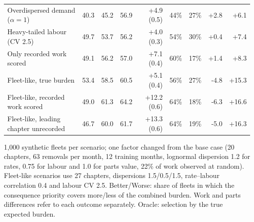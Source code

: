 \begin{table}[htbp]
{\begin{tabular}{lrrrrrrrr}
Overdispersed demand ($\alpha=1$) & 40.3 & 45.2 & 56.9 & +4.9 (0.5) & 44\% & 27\% & +2.8 & +6.1 \\
Heavy-tailed labour (CV 2.5) & 49.7 & 53.7 & 56.2 & +4.0 (0.3) & 54\% & 30\% & +0.4 & +7.4 \\
Only recorded work scored & 49.1 & 56.2 & 57.0 & +7.1 (0.4) & 60\% & 17\% & +1.4 & +8.3 \\
Fleet-like, true burden & 53.4 & 58.5 & 60.5 & +5.1 (0.4) & 56\% & 27\% & -4.8 & +15.3 \\
Fleet-like, recorded work scored & 49.0 & 61.3 & 64.2 & +12.2 (0.6) & 64\% & 18\% & -6.3 & +16.6 \\
Fleet-like, leading chapter unrecorded & 46.7 & 60.0 & 61.7 & +13.3 (0.6) & 64\% & 19\% & -5.0 & +16.3 \\
\bottomrule
\end{tabular}}
\par\smallskip
{\footnotesize 1,000 synthetic fleets per scenario; one factor changed from the base case (20 chapters, 63 removals per month, 12 training months, lognormal dispersion 1.2 for rates, 0.75 for labour and 1.0 for parts value, 22\% of work observed at random). Fleet-like scenarios use 27 chapters, dispersions 1.5/0.5/1.5, rate--labour correlation 0.4 and labour CV 2.5. Better/Worse: share of fleets in which the consequence priority covers more/less of the combined burden. Work and parts differences refer to each outcome separately. Oracle: selection by the true expected burden.}
\end{table}
